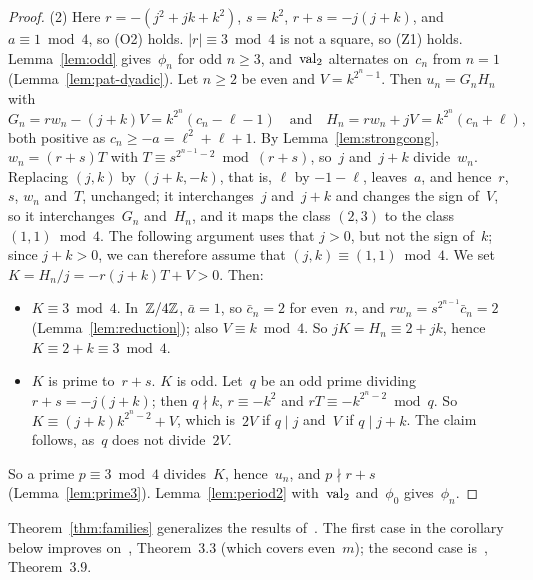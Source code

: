 \begin{proof}
  (2) Here $r = -(j^2 + jk + k^2)$, $s = k^2$, $r + s = -j(j + k)$, and $a \equiv 1 \bmod 4$, so
  (O2) holds. $|r| \equiv 3 \bmod 4$ is not a square, so (Z1) holds. Lemma~\ref{lem:odd}
  gives~$\phi_n$ for odd $n \ge 3$, and~$\operatorname{val}_2$ alternates on~$c_n$ from $n = 1$
  (Lemma~\ref{lem:pat-dyadic}). Let $n \ge 2$ be even and $V = k^{2^n - 1}$. Then
  $u_n = G_n H_n$ with
  \[ G_n = r w_n - (j + k) V = k^{2^n}(c_n - \ell - 1) \quad \text{and} \quad
     H_n = r w_n + j V = k^{2^n}(c_n + \ell), \]
  both positive as $c_n \ge -a = \ell^2 + \ell + 1$. By Lemma~\ref{lem:strongcong},
  $w_n = (r + s) T$ with $T \equiv s^{2^{n-1} - 2} \bmod (r + s)$, so~$j$ and~$j + k$ divide~$w_n$.
  Replacing $(j, k)$ by $(j + k, -k)$, that is, $\ell$ by $-1 - \ell$, leaves~$a$, and hence~$r$,
  $s$, $w_n$ and~$T$, unchanged; it interchanges~$j$ and~$j + k$ and changes the sign of~$V$, so
  it interchanges~$G_n$ and~$H_n$, and it maps the class $(2, 3)$ to the class
  $(1, 1) \bmod 4$. The following argument uses that $j > 0$, but not the sign of~$k$; since
  $j + k > 0$, we can therefore assume that $(j, k) \equiv (1, 1) \bmod 4$. We set
  $K = H_n / j = -r(j + k) T + V > 0$. Then:
  \begin{itemize}
    \item $K \equiv 3 \bmod 4$. In~$\mathbb{Z}/4\mathbb{Z}$, $\bar a = 1$, so $\bar c_n = 2$ for even~$n$, and
          $r w_n = s^{2^{n-1}} \bar c_n = 2$ (Lemma~\ref{lem:reduction}); also $V \equiv k \bmod 4$.
          So $jK = H_n \equiv 2 + jk$, hence $K \equiv 2 + k \equiv 3 \bmod 4$.
    \item $K$ is prime to~$r + s$. $K$ is odd. Let~$q$ be an odd prime dividing
          $r + s = -j(j + k)$; then $q \nmid k$, $r \equiv -k^2$ and
          $r T \equiv -k^{2^n - 2} \bmod q$. So $K \equiv (j + k)k^{2^n - 2} + V$, which is~$2V$
          if $q \mid j$ and~$V$ if $q \mid j + k$. The claim follows, as~$q$ does not divide~$2V$.
  \end{itemize}
  So a prime $p \equiv 3 \bmod 4$ divides~$K$, hence~$u_n$, and $p \nmid r + s$
  (Lemma~\ref{lem:prime3}). Lemma~\ref{lem:period2} with~$\operatorname{val}_2$ and~$\phi_0$ gives~$\phi_n$.
\end{proof}

Theorem~\ref{thm:families} generalizes the results of~\cite{li2021}. The first case in the
corollary below improves on~\cite{li2021}, Theorem~3.3 (which covers even~$m$); the second case
is~\cite{li2021}, Theorem~3.9.

